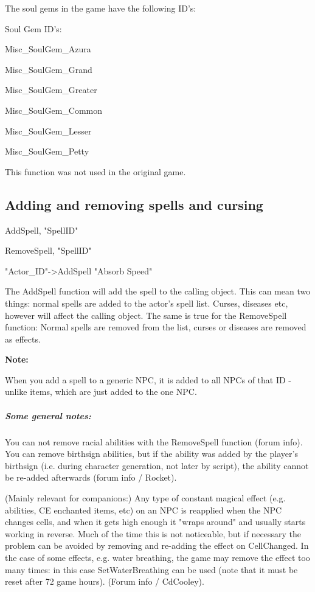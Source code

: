 The soul gems in the game have the following ID's:

Soul Gem ID's:

Misc\_SoulGem\_Azura

Misc\_SoulGem\_Grand

Misc\_SoulGem\_Greater

Misc\_SoulGem\_Common

Misc\_SoulGem\_Lesser

Misc\_SoulGem\_Petty

This function was not used in the original game.

\hypertarget{adding-and-removing-spells-and-cursing}{%
\subsection{\texorpdfstring{\hfill\break
Adding and removing spells and cursing
}{ Adding and removing spells and cursing }}\label{adding-and-removing-spells-and-cursing}}

AddSpell, "SpellID"

RemoveSpell, "SpellID"

"Actor\_ID"-\textgreater AddSpell "Absorb Speed"

The AddSpell function will add the spell to the calling object. This can
mean two things: normal spells are added to the actor's spell list.
Curses, diseases etc, however will affect the calling object. The same
is true for the RemoveSpell function: Normal spells are removed from the
list, curses or diseases are removed as effects.

\textbf{Note:}

When you add a spell to a generic NPC, it is added to all NPCs of that
ID - unlike items, which are just added to the one NPC.

\hypertarget{some-general-notes}{%
\subparagraph{Some general notes:}\label{some-general-notes}}

You can not remove racial abilities with the RemoveSpell function (forum
info). You can remove birthsign abilities, but if the ability was added
by the player's birthsign (i.e. during character generation, not later
by script), the ability cannot be re-added afterwards (forum info /
Rocket).

(Mainly relevant for companions:) Any type of constant magical effect
(e.g. abilities, CE enchanted items, etc) on an NPC is reapplied when
the NPC changes cells, and when it gets high enough it "wraps around"
and usually starts working in reverse. Much of the time this is not
noticeable, but if necessary the problem can be avoided by removing and
re-adding the effect on CellChanged. In the case of some effects, e.g.
water breathing, the game may remove the effect too many times: in this
case SetWaterBreathing can be used (note that it must be reset after 72
game hours). (Forum info / CdCooley).


